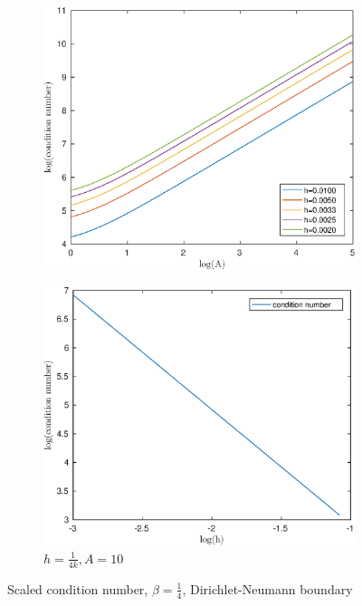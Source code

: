 \documentclass[12pt]{article}
\begin{document}
\begin{figure}[h!]
\centering
\begin{subfigure}{0.4\textwidth}
\includegraphics[width=\textwidth]{cond-A-4-DN}
\caption{}
\end{subfigure}
\hfill
\begin{subfigure}{0.4\textwidth}
\includegraphics[width=\textwidth]{cond-N-4-DN}
\caption{$h=\frac{1}{4k},A=10$}
\end{subfigure}
\caption{Scaled condition number, $\beta=\frac{1}{4}$, Dirichlet-Neumann boundary}
\end{figure}
\end{document}
